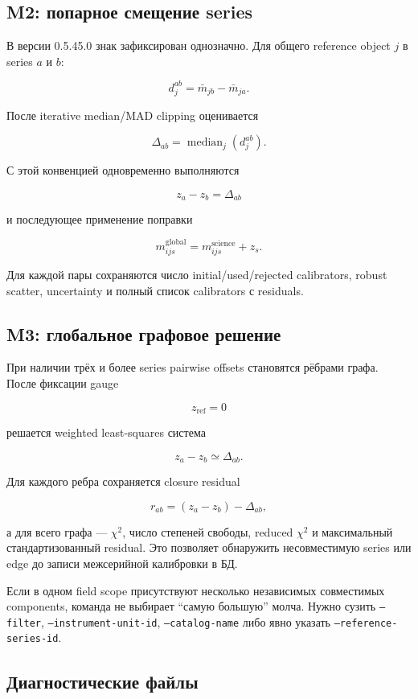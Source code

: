 \subsection{M2: попарное смещение series}

В версии 0.5.45.0 знак зафиксирован однозначно. Для общего reference object $j$ в series $a$ и $b$:

\[
  d_j^{ab}=\bar m_{jb}-\bar m_{ja}.
\]

После iterative median/MAD clipping оценивается

\[
  \Delta_{ab}=\operatorname{median}_j(d_j^{ab}).
\]

С этой конвенцией одновременно выполняются

\[
  z_a-z_b=\Delta_{ab}
\]

и последующее применение поправки

\[
  m^{\mathrm{global}}_{ijs}=m^{\mathrm{science}}_{ijs}+z_s.
\]

Для каждой пары сохраняются число initial/used/rejected calibrators, robust scatter, uncertainty и полный список calibrators с residuals.

\subsection{M3: глобальное графовое решение}

При наличии трёх и более series pairwise offsets становятся рёбрами графа. После фиксации gauge

\[
  z_{\mathrm{ref}}=0
\]

решается weighted least-squares система

\[
  z_a-z_b\simeq\Delta_{ab}.
\]

Для каждого ребра сохраняется closure residual

\[
  r_{ab}=(z_a-z_b)-\Delta_{ab},
\]

а для всего графа --- $\chi^2$, число степеней свободы, reduced $\chi^2$ и максимальный стандартизованный residual. Это позволяет обнаружить несовместимую series или edge до записи межсерийной калибровки в БД.

Если в одном field scope присутствуют несколько независимых совместимых components, команда не выбирает ``самую большую'' молча. Нужно сузить \texttt{--filter}, \texttt{--instrument-unit-id}, \texttt{--catalog-name} либо явно указать \texttt{--reference-series-id}.

\subsection{Диагностические файлы}


